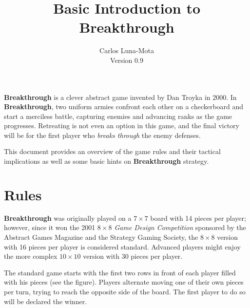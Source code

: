 \documentclass[a4paper,12pt]{article}
\newcommand{\BT}{\textbf{Breakthrough}\xspace}  %
\begin{document}

    \title{Basic Introduction to Breakthrough}
    \author{Carlos Luna-Mota \\ Version 0.9}
    \date{}
    \maketitle

    \BT is a clever abstract game invented by Dan Troyka in 2000.  In \BT, two uniform armies confront each other on a checkerboard and start a merciless battle, capturing enemies and advancing ranks as the game progresses.  Retreating is not even an option in this game, and the final victory will be for the first player who \emph{breaks through} the enemy defenses.

    This document provides an overview of the game rules and their tactical implications as well as some basic hints on \BT strategy.

    \section{Rules}

    \begin{minipage}[c]{0.36\linewidth}
        \begin{center}
            \begin{othelloboardnorefs}{0.75}
                \gridrefs
            \end{othelloboardnorefs}
        \end{center}
    \end{minipage}
    \hfill
    \begin{minipage}[c]{0.62\linewidth}

        \BT was originally played on a $7\!\!\times\!\!7$ board with 14 pieces per player; however, since it won the 2001 \emph{$8\!\!\times\!\!8$ Game Design Competition} sponsored by the Abstract Games Magazine and the Strategy Gaming Society, the $8\!\!\times\!\!8$ version with 16 pieces per player is considered standard.  Advanced players might enjoy the more complex $10\!\!\times\!\!10$ version with 30 pieces per player.

        The standard game starts with the first two rows in front of each player filled with his pieces (see the figure). Players alternate moving one of their own pieces per turn, trying to reach the opposite side of the board.  The first player to do so will be declared the winner.
    \end{minipage}
\end{document}
